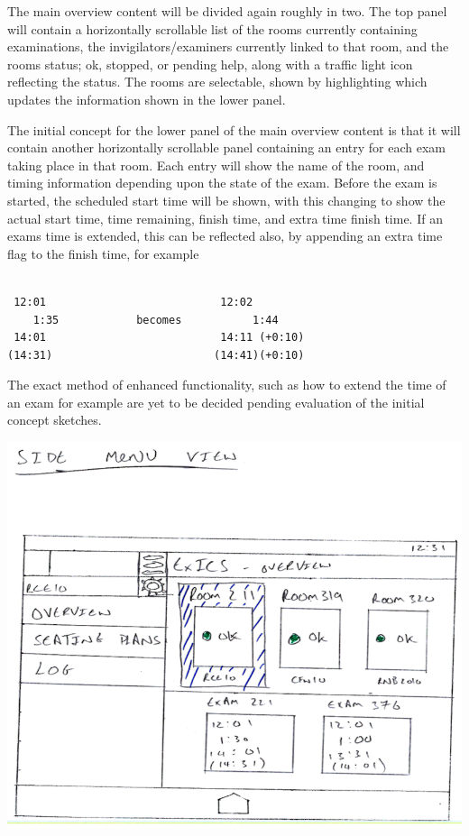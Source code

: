 The main overview content will be divided again roughly in two.  The top panel will contain a horizontally scrollable list of the rooms currently containing examinations, the invigilators/examiners currently linked to that room, and the rooms status; ok, stopped, or pending help, along with a traffic light icon reflecting the status.  The rooms are selectable, shown by highlighting which updates the information shown in the lower panel.

The initial concept for the lower panel of the main overview content is that it will contain another horizontally scrollable panel containing an entry for each exam taking place in that room.  Each entry will show the name of the room, and timing information depending upon the state of the exam.  Before the exam is started, the scheduled start time will be shown, with this changing to show the actual start time, time remaining, finish time, and extra time finish time.  If an exams time is extended, this can be reflected also, by appending an extra time flag to the finish time, for example

\begin{minipage}{\textwidth}
\begin{lstlisting}[captionpos=b,caption=Representation of Examination Timings, tabsize=4, breaklines=true]

 12:01							 12:02
	1:35			becomes			  1:44
 14:01							 14:11 (+0:10)
(14:31)							(14:41)(+0:10)

\end{lstlisting}
\end{minipage}

The exact method of enhanced functionality, such as how to extend the time of an exam for example are yet to be decided pending evaluation of the initial concept sketches.

\includegraphics[width=\textwidth]{"GUI Sketches/Side Menu View Cropped"}

